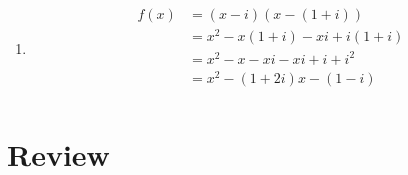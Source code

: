 \documentclass{exam}
\begin{document}
\begin{description}
\begin{enumerate}[a]
          \item
            \begin{align*}
              f(x) &= (x - i)(x - (1 + i)) \\
                   &= x^2 - x(1 + i) -xi + i(1 + i) \\
                   &= x^2 - x - xi - xi + i + i^2 \\
                   &= \boxed{x^2 - (1 + 2i)x - (1 - i)} \\
            \end{align*}
        \end{enumerate}

    \end{description}

    \pagebreak

  \fi
  
  \section{Review}
\end{document}
